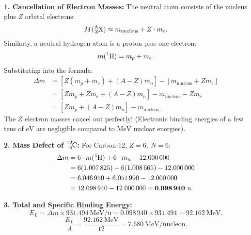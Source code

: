 \begin{solution}
\textbf{1. Cancellation of Electron Masses:}
The neutral atom consists of the nucleus plus $Z$ orbital electrons:
\[
M(\ce{^{A}_{Z}X}) \approx m_{\text{nucleus}} + Z \cdot m_e.
\]
Similarly, a neutral hydrogen atom is a proton plus one electron:
\[
m(\ce{^1H}) = m_p + m_e.
\]
Substituting into the formula:
\begin{align*}
\Delta m &= \left[ Z(m_p + m_e) + (A - Z) m_n \right] - \left[ m_{\text{nucleus}} + Z m_e \right] \\
         &= \left[ Z m_p + Z m_e + (A - Z) m_n \right] - m_{\text{nucleus}} - Z m_e \\
         &= \left[ Z m_p + (A - Z) m_n \right] - m_{\text{nucleus}}.
\end{align*}
The $Z$ electron masses cancel out perfectly! (Electronic binding energies of a few tens of $\mathrm{eV}$ are negligible compared to $\mathrm{MeV}$ nuclear energies).

\textbf{2. Mass Defect of $\ce{^{12}_{6}C}$:}
For Carbon-12, $Z = 6,\ N = 6$:
\begin{align*}
\Delta m &= 6 \cdot m(\ce{^1H}) + 6 \cdot m_n - 12.000\,000 \\
         &= 6(1.007\,825) + 6(1.008\,665) - 12.000\,000 \\
         &= 6.046\,950 + 6.051\,990 - 12.000\,000 \\
         &= 12.098\,940 - 12.000\,000 = \mathbf{0.098\,940\ \mathrm{u}}.
\end{align*}

\textbf{3. Total and Specific Binding Energy:}
\[
E_L = \Delta m \times 931.494\ \mathrm{MeV/u} = 0.098\,940 \times 931.494 = \mathbf{92.162\ \mathrm{MeV}}.
\]
\[
\frac{E_L}{A} = \frac{92.162\ \mathrm{MeV}}{12} = \mathbf{7.680\ \mathrm{MeV/nucleon}}.
\]
\end{solution}

